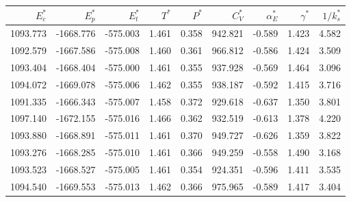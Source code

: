 \begin{tabular}{rrrrrrrrr}
\toprule
$E_c^*$ & $E_p^*$ & $E_t^*$ & $T^*$ & $P^*$ & $C_V^*$ & $\alpha_E^*$ & $\gamma^*$ & $1/k_s^*$ \\
\midrule
1093.773 & -1668.776 & -575.003 & 1.461 & 0.358 & 942.821 & -0.589 & 1.423 & 4.582 \\
1092.579 & -1667.586 & -575.008 & 1.460 & 0.361 & 966.812 & -0.586 & 1.424 & 3.509 \\
1093.404 & -1668.404 & -575.000 & 1.461 & 0.355 & 937.928 & -0.569 & 1.464 & 3.096 \\
1094.072 & -1669.078 & -575.006 & 1.462 & 0.355 & 938.187 & -0.592 & 1.415 & 3.716 \\
1091.335 & -1666.343 & -575.007 & 1.458 & 0.372 & 929.618 & -0.637 & 1.350 & 3.801 \\
1097.140 & -1672.155 & -575.016 & 1.466 & 0.362 & 932.519 & -0.613 & 1.378 & 4.220 \\
1093.880 & -1668.891 & -575.011 & 1.461 & 0.370 & 949.727 & -0.626 & 1.359 & 3.822 \\
1093.276 & -1668.285 & -575.010 & 1.461 & 0.366 & 949.259 & -0.558 & 1.490 & 3.168 \\
1093.523 & -1668.527 & -575.005 & 1.461 & 0.354 & 924.351 & -0.596 & 1.411 & 3.535 \\
1094.540 & -1669.553 & -575.013 & 1.462 & 0.366 & 975.965 & -0.589 & 1.417 & 3.404 \\
\bottomrule
\end{tabular}
